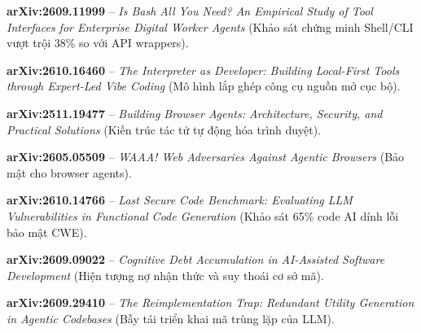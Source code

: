 \documentclass[a4paper,11pt]{report}
\begin{document}
\begin{enumerate}[label={[\arabic*]}]
    \item \textbf{arXiv:2609.11999} -- \textit{Is Bash All You Need? An Empirical Study of Tool Interfaces for Enterprise Digital Worker Agents} (Khảo sát chứng minh Shell/CLI vượt trội 38\% so với API wrappers).
    \item \textbf{arXiv:2610.16460} -- \textit{The Interpreter as Developer: Building Local-First Tools through Expert-Led Vibe Coding} (Mô hình lắp ghép công cụ nguồn mở cục bộ).
    \item \textbf{arXiv:2511.19477} -- \textit{Building Browser Agents: Architecture, Security, and Practical Solutions} (Kiến trúc tác tử tự động hóa trình duyệt).
    \item \textbf{arXiv:2605.05509} -- \textit{WAAA! Web Adversaries Against Agentic Browsers} (Bảo mật cho browser agents).
    \item \textbf{arXiv:2610.14766} -- \textit{Last Secure Code Benchmark: Evaluating LLM Vulnerabilities in Functional Code Generation} (Khảo sát 65\% code AI dính lỗi bảo mật CWE).
    \item \textbf{arXiv:2609.09022} -- \textit{Cognitive Debt Accumulation in AI-Assisted Software Development} (Hiện tượng nợ nhận thức và suy thoái cơ sở mã).
    \item \textbf{arXiv:2609.29410} -- \textit{The Reimplementation Trap: Redundant Utility Generation in Agentic Codebases} (Bẫy tái triển khai mã trùng lặp của LLM).
\end{enumerate}
\end{document}
